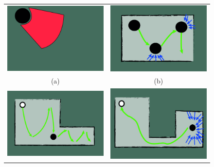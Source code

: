\begin{figure}
     \begin{tabular}{cc}
     \centering
        \includegraphics[width=.45\textwidth]{images/exploration1.jpg}&
        \includegraphics[width=.45\textwidth]{images/exploration2.jpg}\\
        (a)&(b)\\
        \includegraphics[width=.49\textwidth]{images/exploration3.jpg}&
        \includegraphics[width=.45\textwidth]{images/exploration4.jpg}\\

\end{tabular}
\end{figure}
